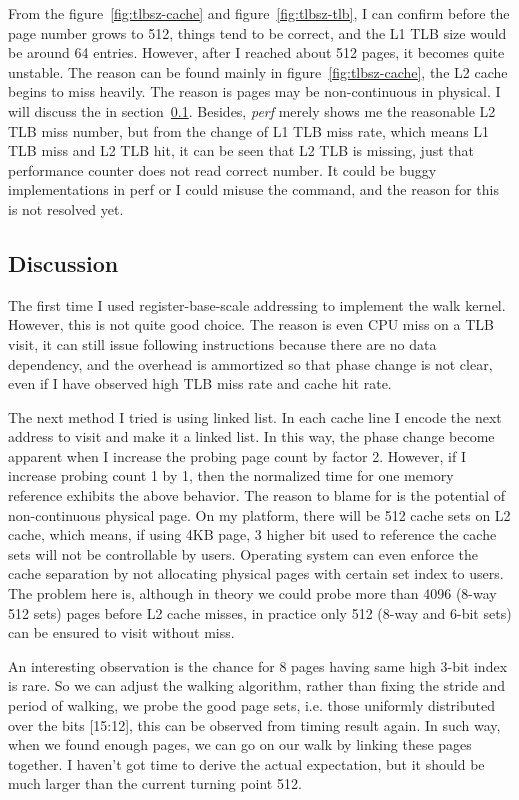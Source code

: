 From the figure~\ref{fig:tlbsz-cache} and figure~\ref{fig:tlbsz-tlb}, I can
confirm before the page number grows to 512, things tend to be correct, and the
L1 TLB size would be around 64 entries. However, after I reached about 512
pages, it becomes quite unstable. The reason can be found mainly in
figure~\ref{fig:tlbsz-cache}, the L2 cache begins to miss heavily.  The reason
is pages may be non-continuous in physical. I will discuss the in
section~\ref{subsec:tlb-discus}. Besides, \emph{perf} merely shows me the reasonable
L2 TLB miss number, but from the change of L1 TLB miss rate, which means L1 TLB
miss and L2 TLB hit, it can be seen that L2 TLB is missing, just that performance
counter does not read correct number. It could be buggy implementations in perf or
I could misuse the command, and the reason for this is not resolved yet.

\subsection{Discussion}
\label{subsec:tlb-discus}
The first time I used register-base-scale addressing to implement the walk
kernel. However, this is not quite good choice. The reason is even CPU miss
on a TLB visit, it can still issue following instructions because there are
no data dependency, and the overhead is ammortized so that phase change is
not clear, even if I have observed high TLB miss rate and cache hit rate.

The next method I tried is using linked list. In each cache line I encode the
next address to visit and make it a linked list. In this way, the phase change
become apparent when I increase the probing page count by factor 2. However, if
I increase probing count 1 by 1, then the normalized time for one memory
reference exhibits the above behavior. The reason to blame for is the potential
of non-continuous physical page. On my platform, there will be 512 cache sets
on L2 cache, which means, if using 4KB page, 3 higher bit used to reference
the cache sets will not be controllable by users. Operating system can even
enforce the cache separation by not allocating physical pages with certain
set index to users. The problem here is, although in theory we could probe
more than 4096 (8-way 512 sets) pages before L2 cache misses, in practice
only 512 (8-way and 6-bit sets) can be ensured to visit without miss.

An interesting observation is the chance for 8 pages having same high 3-bit
index is rare. So we can adjust the walking algorithm, rather than fixing the
stride and period of walking, we probe the good page sets, i.e. those uniformly
distributed over the bits [15:12], this can be observed from timing result
again. In such way, when we found enough pages, we can go on our walk by linking
these pages together. I haven't got time to derive the actual expectation, but
it should be much larger than the current turning point 512.

